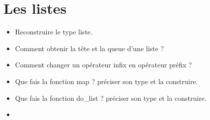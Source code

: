 \documentclass[a4paper, 11pt, hidelinks]{article}
\begin{document}
\section{Les listes}


\begin{itemize}
    \item Reconstruire le type liste.
    \item Comment obtenir la tête et la queue d'une liste ?
    \item Comment changer un opérateur infix en opérateur préfix ?
    \item Que fais la fonction map ? préciser son type et la construire.
    \item Que fais la fonction do\_list ? préciser son type et la construire.
    \item 
\end{itemize}
\end{document}
